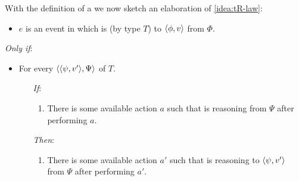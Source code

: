 \begin{note}
  With the definition of a \tor{} we now sketch an elaboration of \autoref{idea:tR-law}:

  \begin{sketch}[\tRN{2}]
    \label{sketch:tR}

    \noindent%

    \begin{itemize}
    \item
      \(e\) is an event in which \vAgent{} is \emph{} (by type \(T\)) to \(\langle \phi, v \rangle\) from \(\Phi\).
    \end{itemize}

    \emph{Only if}:

    \begin{itemize}[noitemsep]
      \item
        For every \tI{} \(\langle \langle \psi, v' \rangle, \Psi \rangle\) of \(T\).
        \begin{itemize}[noitemsep]
        \item[\emph{If}:]
          \begin{enumerate}[label=\alph*., ref=(\alph*), series=tRSketch]
            \label{sketch:tR:action}
          \item
            There is some available action \(a\) such that \vAgent{} is reasoning from \(\Psi\) after performing \(a\).
          \end{enumerate}
        \item[\emph{Then}:]
          \begin{enumerate}[label=\alph*., ref=(\alph*), resume*=tRSketch]
          \item
            \label{sketch:tR:prog}
            There is some available action \(a'\) such that \vAgent{} is reasoning to \(\langle \psi, v' \rangle\) from \(\Psi\) after performing \(a'\).
          \end{enumerate}
        \end{itemize}
      \end{itemize}
    \vspace{-\baselineskip}
  \end{sketch}


\end{note}
